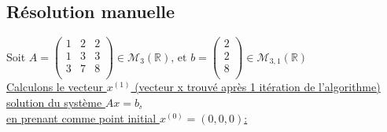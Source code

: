 \subsection{Résolution manuelle}
\vspace{10pt}
Soit $A=
\begin{pmatrix}
  1 & 2 & 2 \\
  1 & 3 & 3 \\
  3 & 7 & 8 \\
\end{pmatrix} \in \mathcal{M}_{3}(\mathbb{R}) \text{, et } 
b=
\begin{pmatrix}
  2 \\
  2 \\
  8 \\
\end{pmatrix} \in \mathcal{M}_{3, 1}(\mathbb{R})$\vspace{10pt}\\
\underline{Calculons le vecteur $x^{(1)}$ (vecteur x trouvé après 1 itération de l'algorithme) solution du système $Ax=b$, }\vspace{10pt}\\
\underline{en prenant comme point initial $x^{(0)}=(0,0,0)$:} \\
